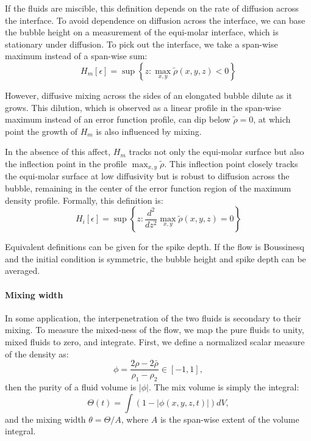 If the fluids are miscible, this definition depends on the rate of diffusion across the interface.
To avoid dependence on diffusion across the interface, we can base the bubble height on a measurement of the equi-molar interface, which is stationary under diffusion.
To pick out the interface, we take a span-wise maximum instead of a span-wise sum:
\begin{equation}
H_m[\epsilon] = \sup \left\{z : \max_{x,y} \tilde\rho(x,y,z) < 0 \right\}
\end{equation}

However, diffusive mixing across the sides of an elongated bubble dilute as it grows.
This dilution, which is observed as a linear profile in the span-wise maximum instead of an error function profile, can dip below $\tilde\rho = 0$, at which point the growth of $H_m$ is also influenced by mixing.

In the absence of this affect, $H_{m}$ tracks not only the equi-molar surface but also the inflection point in the profile $\max_{x,y} \tilde \rho$.
This inflection point closely tracks the equi-molar surface at low diffusivity but is robust to diffusion across the bubble, remaining in the center of the error function region of the maximum density profile.
Formally, this definition is:
\begin{equation}
H_i[\epsilon] = \sup \left\{z : \frac{d^2}{dz^2} \max_{x,y} \tilde\rho(x,y,z) = 0 \right\}
\end{equation}

Equivalent definitions can be given for the spike depth.
If the flow is Boussinesq and the initial condition is symmetric, the bubble height and spike depth can be averaged.

\paragraph{Mixing width}

In some application, the interpenetration of the two fluids is secondary to their mixing.
To measure the mixed-ness of the flow, we map the pure fluids to unity, mixed fluids to zero, and integrate.
First, we define a normalized scalar measure of the density as:
\begin{equation}
\phi = \frac{2\rho - 2\bar\rho}{\rho_1 - \rho_2} \in \left[-1,1\right],
\end{equation}
then the purity of a fluid volume is $|\phi|$.
The mix volume is simply the integral:
\begin{equation}
\Theta(t) = \int \left(1 - \left|\phi(x,y,z,t)\right|\right) dV,
\end{equation}
and the mixing width $\theta = \Theta / A$, where $A$ is the span-wise extent of the volume integral.


